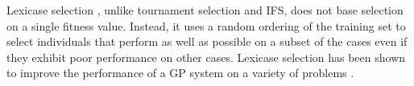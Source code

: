 \documentclass{sig-alternate}
\begin{document}
Lexicase selection \cite{Helmuth:2014:ieeeTEC}, %
 unlike tournament selection and IFS, does not base selection on a single fitness value. Instead, it uses a random ordering of the training set to select individuals that perform as well as possible on a subset of the cases even if they exhibit poor performance on other cases. Lexicase selection has been shown to improve the performance of a GP system on a variety of problems \cite{Helmuth:2014:ieeeTEC, Helmuth:2014:GECCO}.

\end{document}
